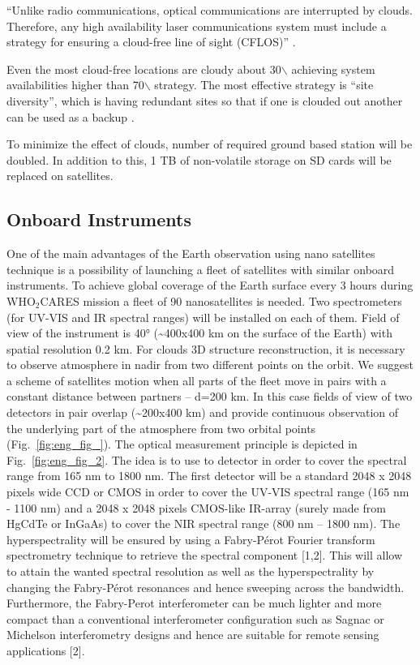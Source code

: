 \documentclass{scrartcl}
\newcommand{\whocares}{WHO$_2$CARES }
\begin{document}
``Unlike radio communications, optical communications are interrupted by
clouds. Therefore, any high availability laser communications system
must include a strategy for ensuring a cloud-free line of sight
(CFLOS)'' \citep{link}.

Even the most cloud-free locations are cloudy about 30$\backslash$%
achieving system availabilities higher than 70$\backslash$%
strategy. The most effective strategy is ``site diversity'', which is
having redundant sites so that if one is clouded out another can be used
as a backup \citep{link}.

To minimize the effect of clouds, number of required ground based
station will be doubled. In addition to this, 1 TB of non-volatile
storage on SD cards will be replaced on satellites.

\subsection{Onboard Instruments}
\label{sec:orgac81367}

One of the main advantages of the Earth observation using nano satellites
technique is a possibility of launching a fleet of satellites with similar
onboard instruments. To achieve global coverage of the Earth surface every 3
hours during \whocares mission a fleet of 90 nanosatellites is needed. Two
spectrometers (for UV-VIS and IR spectral ranges) will be installed on each of
them. Field of view of the instrument is 40° (\textasciitilde{}400x400 km on the surface of the
Earth) with spatial resolution 0.2 km. For clouds 3D structure reconstruction,
it is necessary to observe atmosphere in nadir from two different points on the
orbit. We suggest a scheme of satellites motion when all parts of the fleet move
in pairs with a constant distance between partners – d=200 km. In this case
fields of view of two detectors in pair overlap (\textasciitilde{}200x400 km) and provide
continuous observation of the underlying part of the atmosphere from two orbital
points (Fig.~\ref{fig:eng_fig_}). The optical measurement principle is depicted
in Fig.~\ref{fig:eng_fig_2}. The
idea is to use to detector in order to cover the spectral range from 165 nm to
1800 nm. The first detector will be a standard 2048 x 2048 pixels wide CCD or
CMOS in order to cover the UV-VIS spectral range (165 nm - 1100 nm) and a 2048 x
2048 pixels CMOS-like IR-array (surely made from HgCdTe or InGaAs) to cover the
NIR spectral range (800 nm – 1800 nm). The hyperspectrality will be ensured by
using a Fabry-Pérot Fourier transform spectrometry technique to retrieve the
spectral component [1,2]. This will allow to attain the wanted spectral
resolution as well as the hyperspectrality by changing the Fabry-Pérot
resonances and hence sweeping across the bandwidth. Furthermore, the Fabry-Perot
interferometer can be much lighter and more compact than a conventional
interferometer configuration such as Sagnac or Michelson interferometry designs
and hence are suitable for remote sensing applications [2].
\end{document}
